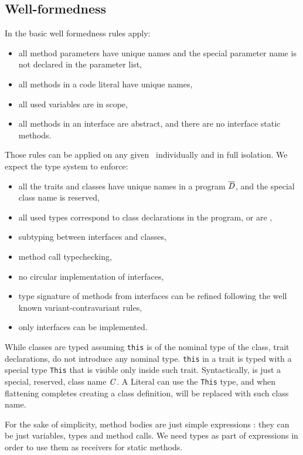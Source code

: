 \subsection{Well-formedness}
In \name the basic well formedness rules apply:
\begin{itemize}
\item all method parameters have unique names and the special parameter name \Q@this@ is not declared
 in the parameter list,
\item all methods in a code literal have unique names,
\item all used variables are in scope,
\item all methods in an interface are abstract, and there are no interface static methods.
\end{itemize}
Those rules can be applied on any given \mL~individually and in full isolation.
We expect the type system to enforce: 
\begin{itemize}
\item all the traits and classes have unique names in a program $\overline{\mathit{D}}$, and the special class name
\Q@This@ is reserved,
\item all used types correspond to class declarations in the program, or are \Q@This@, 
\item subtyping between interfaces and classes,
\item method call typechecking,
\item no circular implementation of interfaces,
\item type signature of methods from interfaces can be refined following the well known variant-contravariant rules,
\item only interfaces can be implemented.
\end{itemize}
While classes are typed assuming \lstinline{this} is of the nominal type of the
class, trait declarations, do not introduce any nominal type.  \lstinline{this}
in a trait is typed with a special type \lstinline{This} that is visible only
inside such trait. Syntactically, \Q@This@ is just a special, reserved, class name $\mathit{C}$.
A Literal can use the \lstinline{This} type,
and when flattening completes creating a class definition, \Q@This@ will be replaced with such class name.

For the sake of simplicity, method bodies are just simple expressions
\me: they can be just variables, types and method calls. We need types as part of expressions in order to use them as receivers for static methods.

